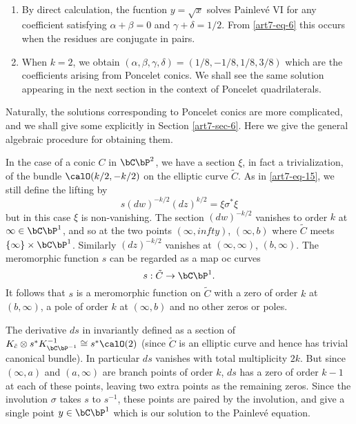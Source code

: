 \begin{remarks*}
~

\begin{enumerate}[1.]
\item By direct calculation, the fucntion $y=\sqrt{x}$ solves Painlev\'e VI for any coefficient satisfying $\alpha + \beta = 0$ and $\gamma +\delta =1/2$. From \eqref{art7-eq-6} this occurs when the residues are conjugate in pairs.

\item When $k=2$, we obtain $(\alpha, \beta, \gamma, \delta) = (1/8, -1/8, 1/8, 3/8)$ which are the coefficients arising from Poncelet conics. We shall see the same solution appearing in the next section in the context of Poncelet quadrilaterals.
\end{enumerate}
\end{remarks*}

\noindent
Naturally, the solutions corresponding to Poncelet conics are more complicated, and we shall give some explicitly in Section \ref{art7-sec-6}. Here we give the general algebraic procedure for obtaining them.

In the case of a conic $C$ in $\bC\bP^{2}$, we have a section $\xi$, in fact a trivialization, of the bundle $\calO(k/2, -k/2)$ on the elliptic curve $\tilde{C}$. As in \eqref{art7-eq-15}, we still define the lifting by
$$
s(dw)^{-k/2}(dz)^{k/2}=\xi\sigma^{*}\xi
$$
but in this case $\xi$ is non-vanishing. The section $(dw)^{-k/2}$ vanishes to order $k$ at $\infty \in \bC\bP^{1}$, and so at the two points $(\infty, infty)$, $(\infty, b)$ where $\tilde{C}$ meets $\{\infty\} \times \bC\bP^{1}$. Similarly $(dz)^{-k/2}$ vanishes at $(\infty, \infty)$, $(b, \infty)$. The meromorphic function $s$ can be regarded as a map oc curves
$$
s:\tilde{C}\rightarrow \bC\bP^{1}.
$$
It follows that $s$ is a meromorphic function on $\tilde{C}$ with a zero of order $k$ at $(b, \infty)$, a pole of order $k$ at $(\infty, b)$ and no other zeros or poles.

The derivative $ds$ in  invariantly defined as a section of $K_{\tilde{c}} \otimes s^{*}K_{\bC\bP^{-1}}^{-1} \cong s^{*}\calO(2)$ (since $\tilde{C}$ is an elliptic curve and hence has trivial canonical bundle). In particular $ds$ vanishes with total multiplicity $2k$. But since $(\infty, a)$ and $(a, \infty)$ are branch points of order $k$, $ds$ has a zero of order $k-1$ at each of these points, leaving two extra points as the remaining zeros. Since the involution $\sigma$ takes $s$ to $s^{-1}$, these points are paired by the involution, and give a single point $y \in \bC\bP^{1}$ which is our solution to the Painlev\'e equation.

